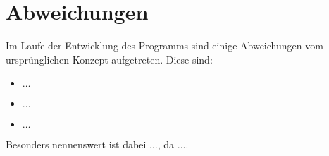 \section{Abweichungen}
\label{sec:abweichungen}

Im Laufe der Entwicklung des Programms sind einige Abweichungen vom ursprünglichen Konzept aufgetreten.
Diese sind:

\begin{itemize}
    \item $\ldots$
    \item $\ldots$
    \item $\ldots$
\end{itemize}

Besonders nennenswert ist dabei $\ldots$, da $\ldots$.

